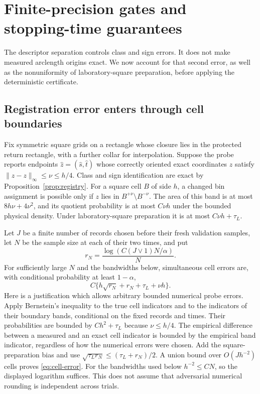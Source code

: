 \section{Finite-precision gates and stopping-time guarantees}
\label{sec:statistics}
The descriptor separation controls class and sign errors. It does not
make measured arclength origins exact. We now account for that second
error, as well as the nonuniformity of laboratory-square preparation,
before applying the deterministic certificate.

\subsection{Registration error enters through cell boundaries}
Fix symmetric square grids on a rectangle whose closure lies in the
protected return rectangle, with a further collar for interpolation.
Suppose the probe reports endpoints $\widehat z=(\widehat s,\widehat t)$
whose correctly oriented exact coordinates $z$ satisfy
$\|\widehat z-z\|_\infty\le\nu\le h/4$. Class and sign identification
are exact by Proposition~\ref{prop:registry}. For a square cell $B$ of
side $h$, a changed bin assignment is possible only if $z$ lies in
$B^{+\nu}\setminus B^{-\nu}$. The area of this band is at most
$8h\nu+4\nu^2$, and its quotient probability is at most $C\nu h$
under the bounded physical density. Under laboratory-square preparation
it is at most $C\nu h+\tau_L$.

Let $J$ be a finite number of records chosen before their fresh validation
samples, let $N$ be the sample size at each of their two times, and put
\[
 r_N=\frac{\log(C(J\vee1)N/\alpha)}{N}.
\]
For sufficiently large $N$ and the bandwidths below, simultaneous cell
errors are, with conditional probability at least $1-\alpha$,
\begin{equation}\label{eq:cell-error}
 C\{h\sqrt{r_N}+r_N+\tau_L+\nu h\}.
\end{equation}
Here is a justification which allows arbitrary bounded numerical probe
errors. Apply Bernstein's inequality to the true cell indicators and to
the indicators of their boundary bands, conditional on the fixed records
and times. Their probabilities are bounded by $Ch^2+\tau_L$ because
$\nu\le h/4$. The empirical difference between a measured and an exact
cell indicator is bounded by the empirical band indicator, regardless
of how the numerical errors were chosen. Add the square-preparation bias
and use $\sqrt{\tau_Lr_N}\le(\tau_L+r_N)/2$. A union bound over
$O(Jh^{-2})$ cells proves \eqref{eq:cell-error}. For the bandwidths used
below $h^{-2}\le CN$, so the displayed logarithm suffices. This does
not assume that adversarial numerical rounding is independent across trials.

